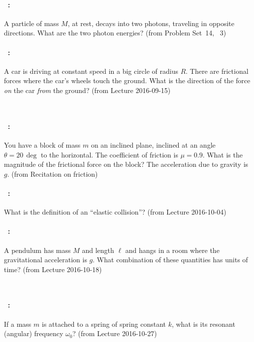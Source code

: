 \documentclass[12pt]{article} 
\begin{document}
\vfill

\paragraph{\problemname~\theproblem:}%
A particle of mass $M$, at rest, decays into two photons, traveling in
opposite directions. What are the two photon energies?
%
(from Problem Set~14, \problemname~3)

\vfill

\paragraph{\problemname~\theproblem:}%
A car is driving at constant speed in a big circle of radius $R$.
There are frictional forces where the car's wheels touch the ground.
What is the direction of the force \emph{on} the car \emph{from} the
ground?
%
(from Lecture 2016-09-15)

\vfill
~
\clearpage

\paragraph{\problemname~\theproblem:}%
You have a block of mass $m$ on an inclined
plane, inclined at an angle $\theta=20\,\deg$ to the horizontal. The
coefficient of friction is $\mu=0.9$. What is the magnitude of the
frictional force on the block? The acceleration due to gravity is $g$.
%
(from Recitation on friction)

\vfill

\paragraph{\problemname~\theproblem:}%
What is the definition of an ``elastic collision''?
%
(from Lecture 2016-10-04)

\vfill

\paragraph{\problemname~\theproblem:}%
A pendulum has mass $M$ and length $\ell$ and hangs in a room where
the gravitational acceleration is $g$. What combination of these
quantities has units of time?
%
(from Lecture 2016-10-18)

\vfill
~
\clearpage

\paragraph{\problemname~\theproblem:}%
If a mass $m$ is attached to a spring of spring constant $k$, what is
its resonant (angular) frequency $\omega_0$?
%
(from Lecture 2016-10-27)
\end{document}
